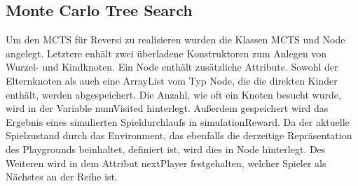 \documentclass[12pt,a4paper]{article}
\begin{document}
\subsection{Monte Carlo Tree Search}
Um den MCTS für Reversi zu realisieren wurden die Klassen MCTS und Node angelegt. Letztere enhält zwei überladene Konstruktoren zum Anlegen von Wurzel- und Kindknoten. Ein Node enthält zusätzliche Attribute. Sowohl der Elternknoten als auch eine ArrayList vom Typ Node, die die direkten Kinder enthält, werden abgespeichert. Die Anzahl, wie oft ein Knoten besucht wurde, wird in der Variable numVisited hinterlegt. Außerdem gespeichert wird das Ergebnis eines simulierten Spieldurchlaufs in simulationReward. Da der aktuelle Spielzustand durch das Environment, das ebenfalls die derzeitige Repräsentation des Playgrounds beinhaltet, definiert ist, wird dies in Node hinterlegt. Des Weiteren wird in dem Attribut nextPlayer festgehalten, welcher Spieler als Nächstes an der Reihe ist.
\end{document}

